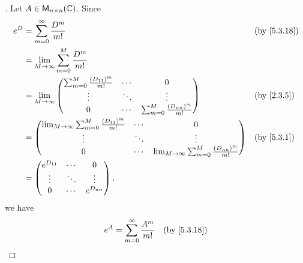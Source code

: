 \begin{proof}[]
	Let \(A \in \ms[n][n][\C]\).
	Since
	\begin{align*}
		e^D & = \sum_{m = 0}^\infty \frac{D^m}{m!}                                                                                                                     &  & \by{5.3.18} \\
		    & = \lim_{M \to \infty} \sum_{m = 0}^M \frac{D^m}{m!}                                                                                                                       \\
		    & = \lim_{M \to \infty} \begin{pmatrix}
			                            \sum_{m = 0}^M \frac{(D_{1 1})^m}{m!} & \cdots & 0                                     \\
			                            \vdots                                & \ddots & \vdots                                \\
			                            0                                     & \cdots & \sum_{m = 0}^M \frac{(D_{n n})^m}{m!}
		                            \end{pmatrix}                                         &  & \by{2.3.5}                                       \\
		    & = \begin{pmatrix}
			        \lim_{M \to \infty} \sum_{m = 0}^M \frac{(D_{1 1})^m}{m!} & \cdots & 0                                                         \\
			        \vdots                                                    & \ddots & \vdots                                                    \\
			        0                                                         & \cdots & \lim_{M \to \infty} \sum_{m = 0}^M \frac{(D_{n n})^m}{m!}
		        \end{pmatrix} &  & \by{5.3.1}                   \\
		    & = \begin{pmatrix}
			        e^{D_{1 1}} & \cdots & 0           \\
			        \vdots      & \ddots & \vdots      \\
			        0           & \cdots & e^{D_{n n}}
		        \end{pmatrix},
	\end{align*}
	we have
	\begin{align*}
		e^A & = \sum_{m = 0}^\infty \frac{A^m}{m!}                                   &  & \by{5.3.18} \\

\end{align*}
\end{proof}
